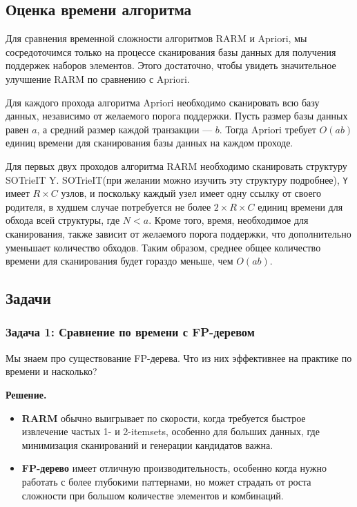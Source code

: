 \subsection{Оценка времени алгоритма}

Для сравнения временной сложности алгоритмов RARM и Apriori, мы сосредоточимся только на процессе сканирования базы данных для получения поддержек наборов элементов. Этого достаточно, чтобы увидеть значительное улучшение RARM по сравнению с Apriori.

Для каждого прохода алгоритма Apriori необходимо сканировать всю базу данных, независимо от желаемого порога поддержки. Пусть размер базы данных равен \(a\), а средний размер каждой транзакции — \(b\). Тогда Apriori требует \(O(ab)\) единиц времени для сканирования базы данных на каждом проходе.

Для первых двух проходов алгоритма RARM необходимо сканировать структуру SOTrieIT Y. SOTrieIT(при желании можно изучить эту структуру подробнее), \texttt{Y} имеет \(R \times C\) узлов, и поскольку каждый узел имеет одну ссылку от своего родителя, в худшем случае потребуется не более \(2 \times R \times C\) единиц времени для обхода всей структуры, где \(N < a\). Кроме того, время, необходимое для сканирования, также зависит от желаемого порога поддержки, что дополнительно уменьшает количество обходов. Таким образом, среднее общее количество времени для сканирования будет гораздо меньше, чем \(O(ab)\).

\subsection{Задачи}

\subsubsection{Задача 1: Сравнение по времени с FP-деревом} Мы знаем про существование FP-дерева. Что из них эффективнее на практике по времени и насколько?

\textbf{Решение.} 

\begin{itemize}
    \item \textbf{RARM} обычно выигрывает по скорости, когда требуется быстрое извлечение частых 1- и 2-itemsets, особенно для больших данных, где минимизация сканирований и генерации кандидатов важна.
    \item \textbf{FP-дерево} имеет отличную производительность, особенно когда нужно работать с более глубокими паттернами, но может страдать от роста сложности при большом количестве элементов и комбинаций.
\end{itemize}

